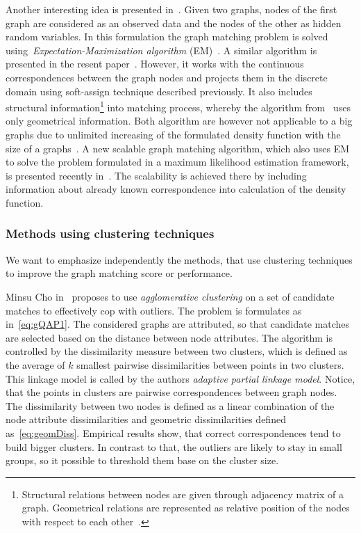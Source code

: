 Another interesting idea is presented in~\cite{Hancock_EM_SVD}. Given two graphs, nodes of the first graph are considered as an observed data and the nodes of the other as hidden random variables. In this formulation the graph matching problem is solved using~\emph{Expectation-Maximization algorithm} (EM)~\cite{EM_Dempster1977}. A similar algorithm is presented in the resent paper~\cite{Sanrom2012}. However, it works with the continuous correspondences between the graph nodes and projects them in the discrete domain using soft-assign technique described previously. It also includes structural information\footnote{Structural relations between nodes are given through adjacency matrix of a graph. Geometrical relations are represented as relative position of the nodes with respect to each other~\cite{Sanrom2012}.} into matching process, whereby the algorithm from~\cite{Hancock_EM_SVD} uses only geometrical information. Both algorithm are however not applicable to a big graphs due to unlimited increasing of the formulated density function with the size of a graphs~\cite{Armiti2014}. A new scalable graph matching algorithm, which also uses EM to solve the problem formulated in a maximum likelihood estimation framework, is presented recently in~\cite{Armiti2014}. The scalability is achieved there by including information about already known correspondence into calculation of the density function.
\subsubsection{Methods using clustering techniques}
We want to emphasize independently the methods, that use clustering techniques to improve the graph matching score or performance.

Minsu Cho in~\cite{Cho2009_AgglClustering} proposes to use \emph{agglomerative clustering} on a set of candidate matches to effectively cop with outliers. The problem is formulates as in~\eqref{eq:gQAP1}. The considered graphs are attributed, so that candidate matches are selected based on the distance between node attributes. The algorithm is controlled by the dissimilarity measure between two clusters, which is defined as the average of $k$ smallest pairwise dissimilarities between points in two clusters. This linkage model is called by the authors \emph{adaptive partial linkage model}. Notice, that the points in clusters are pairwise correspondences between graph nodes. The dissimilarity between two nodes is defined as a linear combination of the node attribute dissimilarities and 
geometric dissimilarities defined as~\eqref{eq:geomDiss}. Empirical results show, that correct correspondences tend to build bigger clusters. In contrast to that, the outliers are likely to stay in small groups, so it possible to threshold them base on the cluster size.

